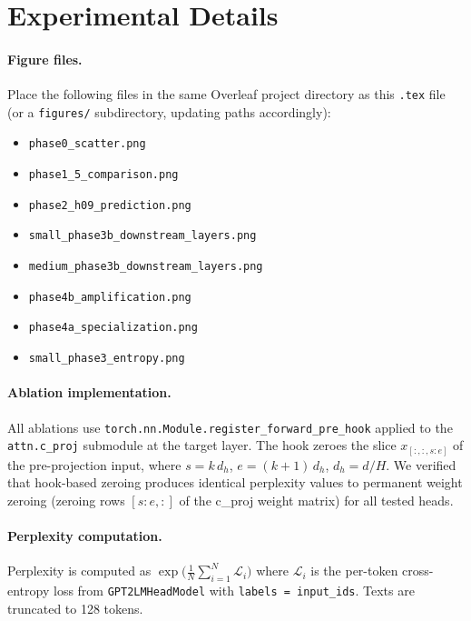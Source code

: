 \documentclass[11pt,a4paper]{article}
\theoremstyle{definition}
\theoremstyle{plain}
\begin{document}



\appendix

\section{Experimental Details}
\label{app:details}

\paragraph{Figure files.}
Place the following files in the same Overleaf project directory as this
\texttt{.tex} file (or a \texttt{figures/} subdirectory, updating paths
accordingly):
\begin{itemize}[topsep=2pt,itemsep=1pt,noitemsep]
    \item \texttt{phase0\_scatter.png}
    \item \texttt{phase1\_5\_comparison.png}
    \item \texttt{phase2\_h09\_prediction.png}
    \item \texttt{small\_phase3b\_downstream\_layers.png}
    \item \texttt{medium\_phase3b\_downstream\_layers.png}
    \item \texttt{phase4b\_amplification.png}
    \item \texttt{phase4a\_specialization.png}
    \item \texttt{small\_phase3\_entropy.png}
\end{itemize}

\paragraph{Ablation implementation.}
All ablations use \texttt{torch.nn.Module.register\_forward\_pre\_hook}
applied to the \texttt{attn.c\_proj} submodule at the target layer.
The hook zeroes the slice $x_{[:,:,s:e]}$ of the pre-projection input,
where $s=k\,d_h$, $e=(k+1)\,d_h$, $d_h=d/H$.
We verified that hook-based zeroing produces identical perplexity values
to permanent weight zeroing (zeroing rows $[s:e,:]$ of the c\_proj
weight matrix) for all tested heads.

\paragraph{Perplexity computation.}
Perplexity is computed as
$\exp\!\bigl(\frac{1}{N}\sum_{i=1}^{N}\mathcal{L}_i\bigr)$
where $\mathcal{L}_i$ is the per-token cross-entropy loss from
\texttt{GPT2LMHeadModel} with \texttt{labels = input\_ids}.
Texts are truncated to 128 tokens.
\end{document}
